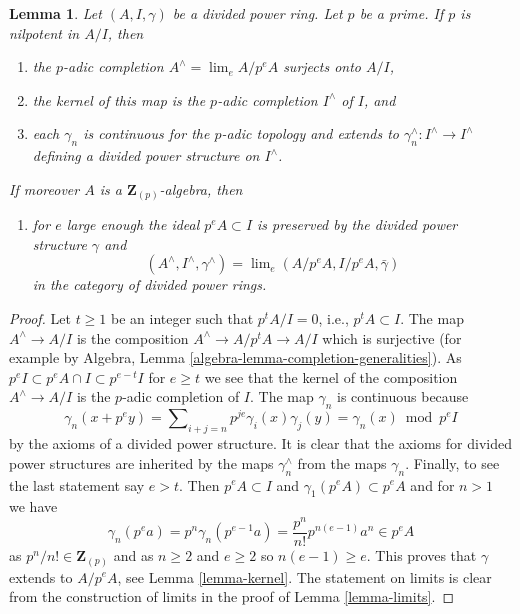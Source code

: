 \documentclass{stacks-project}
\theoremstyle{plain}
\newtheorem{lemma}[subsection]{Lemma}
\theoremstyle{definition}
\theoremstyle{remark}
\numberwithin{equation}{subsection}
\def\lim{\mathop{\mathrm{lim}}\nolimits}
\begin{document}
\begin{lemma}
\label{lemma-extend-to-completion}
Let $(A, I, \gamma)$ be a divided power ring. Let $p$ be a prime.
If $p$ is nilpotent in $A/I$, then
\begin{enumerate}
\item the $p$-adic completion $A^\wedge = \lim_e A/p^eA$ surjects onto $A/I$,
\item the kernel of this map is the $p$-adic completion $I^\wedge$ of $I$, and
\item each $\gamma_n$ is continuous for the $p$-adic topology and extends
to $\gamma_n^\wedge : I^\wedge \to I^\wedge$ defining a divided power
structure on $I^\wedge$.
\end{enumerate}
If moreover $A$ is a $\mathbf{Z}_{(p)}$-algebra, then
\begin{enumerate}
\item[(4)] for $e$ large enough the ideal $p^eA \subset I$ is preserved by the
divided power structure $\gamma$ and
$$
(A^\wedge, I^\wedge, \gamma^\wedge) = \lim_e (A/p^eA, I/p^eA, \bar\gamma)
$$
in the category of divided power rings.
\end{enumerate}
\end{lemma}

\begin{proof}
Let $t \geq 1$ be an integer such that $p^tA/I = 0$, i.e., $p^tA \subset I$.
The map $A^\wedge \to A/I$ is the composition $A^\wedge \to A/p^tA \to A/I$
which is surjective (for example by
Algebra, Lemma \ref{algebra-lemma-completion-generalities}).
As $p^eI \subset p^eA \cap I \subset p^{e - t}I$ for $e \geq t$ we see
that the kernel of the composition $A^\wedge \to A/I$ is the $p$-adic
completion of $I$. The map $\gamma_n$ is continuous because
$$
\gamma_n(x + p^ey) =
\sum\nolimits_{i + j = n} p^{je}\gamma_i(x)\gamma_j(y) =
\gamma_n(x) \bmod p^eI
$$
by the axioms of a divided power structure. It is clear that the axioms
for divided power structures are inherited by the maps $\gamma_n^\wedge$
from the maps $\gamma_n$. Finally, to see the last statement say $e > t$.
Then $p^eA \subset I$ and $\gamma_1(p^eA) \subset p^eA$ and for $n > 1$
we have
$$
\gamma_n(p^ea) = p^n \gamma_n(p^{e - 1}a) = \frac{p^n}{n!} p^{n(e - 1)}a^n
\in p^e A
$$
as $p^n/n! \in \mathbf{Z}_{(p)}$ and as $n \geq 2$ and $e \geq 2$ so
$n(e - 1) \geq e$.
This proves that $\gamma$ extends to $A/p^eA$, see Lemma \ref{lemma-kernel}.
The statement on limits is clear from the construction of limits in
the proof of Lemma \ref{lemma-limits}.
\end{proof}
\end{document}

